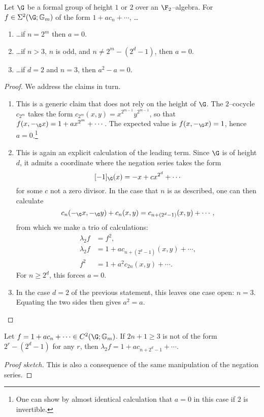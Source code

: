 \begin{lemma}\label{SigmaNonexistenceLemma}
Let $\G$ be a formal group of height $1$ or $2$ over an $\F_2$--algebra.  For $f \in \Sigma^2(\G; \Gm)$ of the form $1 + a c_n + \cdots$, \ldots
\begin{enumerate}
    \item \ldots if $n = 2^m$ then $a = 0$.
    \item \ldots if $n > 3$, $n$ is odd, and $n \ne 2^m - (2^d - 1)$, then $a = 0$.
    \item \ldots if $d = 2$ and $n = 3$, then $a^2 - a = 0$.
\end{enumerate}
\end{lemma}
\begin{proof}
We address the claims in turn.
\begin{enumerate}
    \item This is a generic claim that does not rely on the height of $\G$.  The $2$--cocycle $c_{2^m}$ takes the form $c_{2^m}(x, y) = x^{2^{m-1}} y^{2^{m-1}}$, so that $f(x, -_{\G} x) = 1 + a x^{2^m} + \cdots$.  The expected value is $f(x, -_{\G} x) = 1$, hence $a = 0$.\footnote{One can show by almost identical calculation that $a = 0$ in this case if $2$ is invertible.}
    \item This is again an explicit calculation of the leading term.  Since $\G$ is of height $d$, it admits a coordinate where the negation series takes the form \[[-1]_{\G}(x) = -x + cx^{2^d} + \cdots\] for some $c$ not a zero divisor.  In the case that $n$ is as described, one can then calculate \[c_n(-_{\G} x, -_{\G} y) + c_n(x, y) = c_{n + (2^d-1)}(x, y) + \cdots,\] from which we make a trio of calculations:
    \begin{align*}
    \lambda_2 f & = f^2, \tag{uses $f \in \Sigma^2(\G; \Gm)$} \\
    \lambda_2 f & = 1 + ac_{n + (2^d-1)}(x, y) + \cdots, \tag{above observation} \\
    f^2 & = 1 + a^2 c_{2n}(x, y) + \cdots. \tag{characteristic $2$}
    \end{align*}
    For $n \ge 2^d$, this forces $a = 0$.
    \item In the case $d = 2$ of the previous statement, this leaves one case open: $n = 3$.  Equating the two sides then gives $a^2 = a$.
    \qedhere
\end{enumerate}
\end{proof}

\begin{lemma}\label{SigmaArrowLemma}
Let $f = 1 + a c_n + \cdots \in C^2(\G; \Gm)$.  If $2n+1 \ge 3$ is not of the form $2^r - (2^d - 1)$ for any $r$, then $\lambda_2 f = 1 + a c_{n + 2^d - 1} + \cdots$.
\end{lemma}
\begin{proof}[Proof sketch]
This is also a consequence of the same manipulation of the negation series.
\end{proof}

